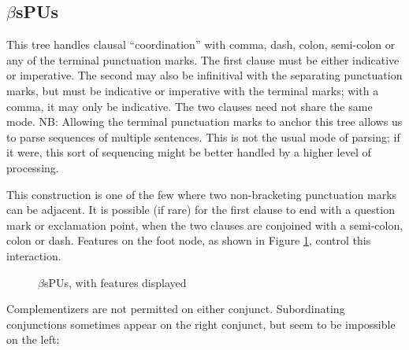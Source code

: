 \subsection{$\beta$sPUs}
\label{sPUs}

This tree handles clausal ``coordination'' with comma, dash, colon,
semi-colon or any of the terminal punctuation marks. The first clause
must be either indicative or imperative. The second may also be
infinitival with the separating punctuation marks, but must be
indicative or imperative with the terminal marks; with a comma, it may
only be indicative. The two clauses need not share the same mode. NB:
Allowing the terminal punctuation marks to anchor this tree allows us
to parse sequences of multiple sentences. This is not the usual mode
of parsing; if it were, this sort of sequencing might be better
handled by a higher level of processing.



This construction is one of the few where two non-bracketing
punctuation marks can be adjacent. It is possible (if rare) for the
first clause to end with a question mark or exclamation point, when
the two clauses are conjoined with a semi-colon, colon or
dash. Features on the foot node, as shown in Figure \ref{sPUs-tree}, control
this interaction.

\begin{figure}[hbt]
\centering
\hspace{0.0in}
\caption{$\beta$sPUs, with features displayed}
\label{sPUs-tree}
\end{figure}

Complementizers are not permitted on either conjunct. Subordinating
conjunctions sometimes appear on the right conjunct, but seem to be
impossible on the left:
	


